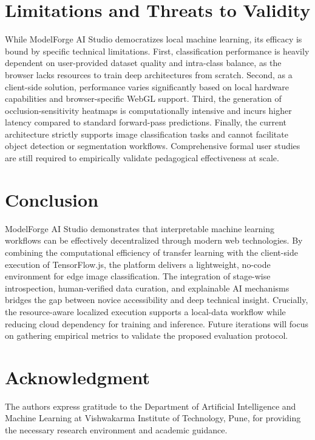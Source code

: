 \documentclass[conference]{IEEEtran}
\begin{document}
\section{Limitations and Threats to Validity}
While ModelForge AI Studio democratizes local machine learning, its efficacy is bound by specific technical limitations. First, classification performance is heavily dependent on user-provided dataset quality and intra-class balance, as the browser lacks resources to train deep architectures from scratch. Second, as a client-side solution, performance varies significantly based on local hardware capabilities and browser-specific WebGL support. Third, the generation of occlusion-sensitivity heatmaps is computationally intensive and incurs higher latency compared to standard forward-pass predictions. Finally, the current architecture strictly supports image classification tasks and cannot facilitate object detection or segmentation workflows. Comprehensive formal user studies are still required to empirically validate pedagogical effectiveness at scale.

\section{Conclusion}

ModelForge AI Studio demonstrates that interpretable machine learning workflows can be effectively decentralized through modern web technologies. By combining the computational efficiency of transfer learning with the client-side execution of TensorFlow.js, the platform delivers a lightweight, no-code environment for edge image classification. The integration of stage-wise introspection, human-verified data curation, and explainable AI mechanisms bridges the gap between novice accessibility and deep technical insight. Crucially, the resource-aware localized execution supports a local-data workflow while reducing cloud dependency for training and inference. Future iterations will focus on gathering empirical metrics to validate the proposed evaluation protocol.

\section*{Acknowledgment}

The authors express gratitude to the Department of Artificial Intelligence and Machine Learning at Vishwakarma Institute of Technology, Pune, for providing the necessary research environment and academic guidance.
\end{document}

